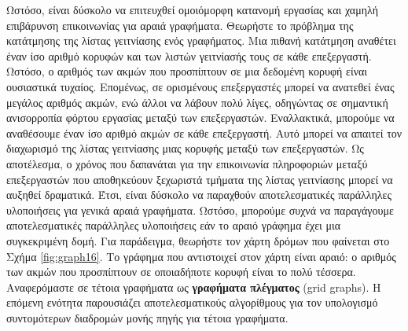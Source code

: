 \documentclass[12pt,a4paper]{article}
\begin{document}
Ωστόσο, είναι δύσκολο να επιτευχθεί ομοιόμορφη κατανομή εργασίας και χαμηλή επιβάρυνση επικοινωνίας για αραιά γραφήματα. Θεωρήστε το πρόβλημα της κατάτμησης της λίστας γειτνίασης ενός γραφήματος. Μια πιθανή κατάτμηση αναθέτει έναν ίσο αριθμό κορυφών και των λιστών γειτνίασής τους σε κάθε επεξεργαστή. Ωστόσο, ο αριθμός των ακμών που προσπίπτουν σε μια δεδομένη κορυφή είναι ουσιαστικά τυχαίος. Επομένως, σε ορισμένους επεξεργαστές μπορεί να ανατεθεί ένας μεγάλος αριθμός ακμών, ενώ άλλοι να λάβουν πολύ λίγες, οδηγώντας σε σημαντική ανισορροπία φόρτου εργασίας μεταξύ των επεξεργαστών. 
Εναλλακτικά, μπορούμε να αναθέσουμε έναν ίσο αριθμό ακμών σε κάθε επεξεργαστή. Αυτό μπορεί να απαιτεί τον διαχωρισμό της λίστας γειτνίασης μιας κορυφής μεταξύ των επεξεργαστών. Ως αποτέλεσμα, ο χρόνος που δαπανάται για την επικοινωνία πληροφοριών μεταξύ επεξεργαστών που αποθηκεύουν ξεχωριστά τμήματα της λίστας γειτνίασης μπορεί να αυξηθεί δραματικά. Έτσι, είναι δύσκολο να παραχθούν αποτελεσματικές παράλληλες υλοποιήσεις για γενικά αραιά γραφήματα.
Ωστόσο, μπορούμε συχνά να παραγάγουμε αποτελεσματικές παράλληλες υλοποιήσεις εάν το αραιό γράφημα έχει μια συγκεκριμένη δομή. Για παράδειγμα, θεωρήστε τον χάρτη δρόμων που φαίνεται στο Σχήμα \ref{fig:graph16}. Το γράφημα που αντιστοιχεί στον χάρτη είναι αραιό: ο αριθμός των ακμών που προσπίπτουν σε οποιαδήποτε κορυφή είναι το πολύ τέσσερα. Αναφερόμαστε σε τέτοια γραφήματα ως \textbf{γραφήματα πλέγματος} (\foreignlanguage{english}{grid graphs}). Η επόμενη ενότητα παρουσιάζει αποτελεσματικούς αλγορίθμους για τον υπολογισμό συντομότερων διαδρομών μονής πηγής για τέτοια γραφήματα.
\vspace{0.3cm}
\end{document}
